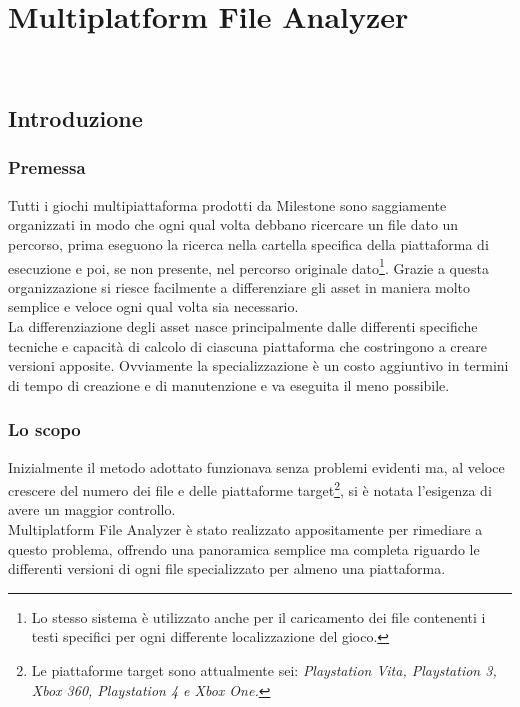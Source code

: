 
\chapter{Multiplatform File Analyzer}
\label{cap:multiplatform-file-analyzer}

\\

\section{Introduzione}

	\subsection{Premessa}
		Tutti i giochi multipiattaforma prodotti da Milestone sono saggiamente organizzati in modo che ogni qual volta debbano ricercare un file dato un percorso, prima eseguono la ricerca nella cartella specifica della piattaforma di esecuzione e poi, se non presente, nel percorso originale dato\footnote{Lo stesso sistema è utilizzato anche per il caricamento dei file contenenti i testi specifici per ogni differente localizzazione del gioco.}. Grazie a questa organizzazione si riesce facilmente a differenziare gli asset in maniera molto semplice e veloce ogni qual volta sia necessario.\\
		La differenziazione degli asset nasce principalmente dalle differenti specifiche tecniche e capacità di calcolo di ciascuna piattaforma che costringono a creare versioni apposite. Ovviamente la specializzazione è un costo aggiuntivo in termini di tempo di creazione e di manutenzione e va eseguita il meno possibile.
		
	\subsection{Lo scopo}
		Inizialmente il metodo adottato funzionava senza problemi evidenti ma, al veloce crescere del numero dei file e delle piattaforme target\footnote{Le piattaforme target sono attualmente sei: \textit{Playstation Vita\textsuperscript{\textregistered}, Playstation 3\textsuperscript{\textregistered}, Xbox 360\textsuperscript{\textregistered}, Playstation 4\textsuperscript{\textregistered} e Xbox One\textsuperscript{\textregistered}.}}, si è notata l'esigenza di avere un maggior controllo.\\
		Multiplatform File Analyzer è stato realizzato appositamente per rimediare a questo problema, offrendo una panoramica semplice ma completa riguardo le differenti versioni di ogni file specializzato per almeno una piattaforma.

